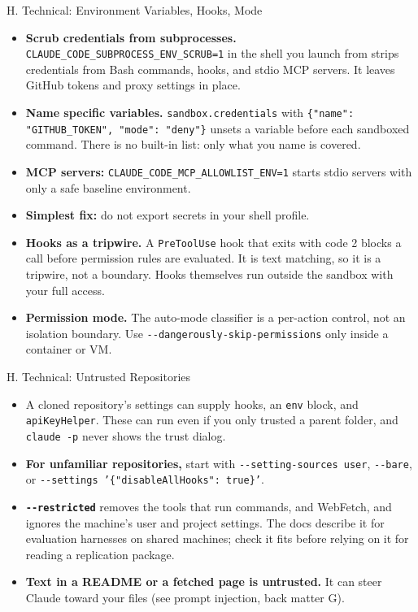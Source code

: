 \documentclass[aspectratio=169, 11pt]{beamer}
\begin{document}
\begin{frame}[label=privenv]{H. Technical: Environment Variables, Hooks, Mode}
  \small
  \begin{itemize}
    \item \textbf{Scrub credentials from subprocesses.} \texttt{CLAUDE\_CODE\_SUBPROCESS\_ENV\_SCRUB=1} in the shell you launch from strips credentials from Bash commands, hooks, and stdio MCP servers. It leaves GitHub tokens and proxy settings in place.
    \item \textbf{Name specific variables.} \texttt{sandbox.credentials} with \texttt{\{"name": "GITHUB\_TOKEN", "mode": "deny"\}} unsets a variable before each sandboxed command. There is no built-in list: only what you name is covered.
    \item \textbf{MCP servers:} \texttt{CLAUDE\_CODE\_MCP\_ALLOWLIST\_ENV=1} starts stdio servers with only a safe baseline environment.
    \item \textbf{Simplest fix:} do not export secrets in your shell profile.
    \item \textbf{Hooks as a tripwire.} A \texttt{PreToolUse} hook that exits with code 2 blocks a call before permission rules are evaluated. It is text matching, so it is a tripwire, not a boundary. Hooks themselves run outside the sandbox with your full access.
    \item \textbf{Permission mode.} The auto-mode classifier is a per-action control, not an isolation boundary. Use \texttt{-{}-dangerously-skip-permissions} only inside a container or VM.
  \end{itemize}
\end{frame}

\begin{frame}[label=privextra2]{H. Technical: Untrusted Repositories}
  \small
  \begin{itemize}
    \item A cloned repository's settings can supply hooks, an \texttt{env} block, and \texttt{apiKeyHelper}. These can run even if you only trusted a parent folder, and \texttt{claude -p} never shows the trust dialog.
    \item \textbf{For unfamiliar repositories,} start with \texttt{-{}-setting-sources user}, \texttt{-{}-bare}, or \texttt{-{}-settings '\{"disableAllHooks": true\}'}.
    \item \textbf{\texttt{-{}-restricted}} removes the tools that run commands, and WebFetch, and ignores the machine's user and project settings. The docs describe it for evaluation harnesses on shared machines; check it fits before relying on it for reading a replication package.
    \item \textbf{Text in a README or a fetched page is untrusted.} It can steer Claude toward your files (see prompt injection, back matter G).
  \end{itemize}
  \vfill
  \hyperlink{backmatter}{}
\end{frame}
\end{document}

